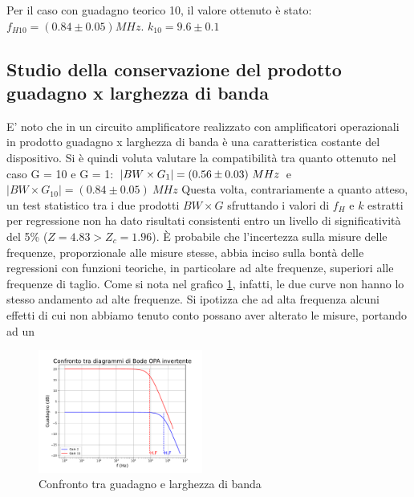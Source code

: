 \documentclass[journal]{IEEEtran}
\begin{document}
Per il caso con guadagno teorico 10, il valore ottenuto è stato:
$f_{H10} = (0.84 \pm 0.05) MHz$.
$k_{10} = 9.6 \pm 0.1$

\subsection{\textbf{Studio della conservazione del prodotto guadagno x larghezza di banda}}

E' noto che in un circuito amplificatore realizzato con amplificatori operazionali in prodotto guadagno x larghezza di banda è una caratteristica costante del dispositivo. Si è quindi voluta valutare la compatibilità tra quanto ottenuto nel caso G = 10 e G = 1: $\\ | BW \times G_1 | = (0.56 \pm 0.03)\ MHz \\$  e  $ | BW \times G_{10} | = (0.84 \pm 0.05)\ MHz$
Questa volta, contrariamente a quanto atteso, un test statistico tra i due prodotti $BW \times G$ sfruttando i valori di $f_H$ e $k$ estratti per regressione non ha dato risultati consistenti entro un livello di significatività del 5\% ($Z = 4.83 > Z_c = 1.96$). 
È probabile che l'incertezza sulla misure delle frequenze, proporzionale alle misure stesse, abbia inciso sulla bontà delle regressioni con funzioni teoriche, in particolare ad alte frequenze, superiori alle frequenze di taglio. Come si nota nel grafico \ref{fig:OPA-bode_gain_comparison(mag)}, infatti, le due curve non hanno lo stesso andamento ad alte frequenze. Si ipotizza che ad alta frequenza alcuni effetti di cui non abbiamo tenuto conto possano aver alterato le misure, portando ad un 


\begin{figure}[H]%
\begin {center}
\includegraphics[width=0.48\textwidth]{analysis/output/OPA-bode_gain_comparison(mag).pdf}
\caption{Confronto tra guadagno e larghezza di banda}
\label{fig:OPA-bode_gain_comparison(mag)}
\end {center}
\end{figure}
\end{document}
